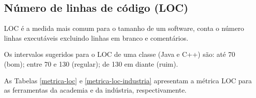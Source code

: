 

\subsection{Número de linhas de código (LOC)}

LOC é a medida mais comum para o tamanho de um software, conta o número linhas
executáveis excluindo linhas em branco e comentários.

Os intervalos sugeridos para o LOC de uma classe (Java e C++) são: até 70
(bom); entre 70 e 130 (regular); de 130 em diante (ruim).

As Tabelas \ref{metrica-loc} e \ref{metrica-loc-industria} apresentam a
métrica LOC para as ferramentas da academia e da indústria, respectivamente.


